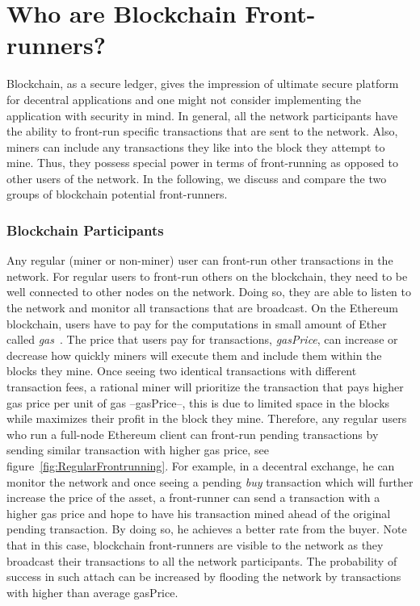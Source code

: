 
\section{Who are Blockchain Front-runners?} %
\label{sec:who can front-run?}

Blockchain, as a secure ledger, gives the impression of ultimate secure platform for decentral applications and one might not consider implementing the application with security in mind. In general, all the network participants have the ability to front-run specific transactions that are sent to the network. Also, miners can include any transactions they like into the block they attempt to mine. Thus, they possess special power in terms of front-running as opposed to other users of the network. In the following, we discuss and compare the two groups of blockchain potential front-runners.

\subsubsection{Blockchain Participants}
Any regular (miner or non-miner) user can front-run other transactions in the network. For regular users to front-run others on the blockchain, they need to be well connected to other nodes on the network. Doing so, they are able to listen to the network and monitor all transactions that are broadcast. On the Ethereum blockchain, users have to pay for the computations in small amount of Ether called \textit{gas}~\cite{AccountT67:online}. The price that users pay for transactions, \textit{gasPrice}, can increase or decrease how quickly miners will execute them and include them within the blocks they mine. Once seeing two identical transactions with different transaction fees, a rational miner will prioritize the transaction that pays higher gas price per unit of gas --gasPrice--, this is due to limited space in the blocks while maximizes their profit in the block they mine. Therefore, any regular users who run a full-node Ethereum client can front-run pending transactions by sending similar transaction with higher gas price, see figure~\ref{fig:RegularFrontrunning}. For example, in a decentral exchange, he can monitor the network and once seeing a pending \textit{buy} transaction which will further increase the price of the asset, a front-runner can send a transaction with a higher gas price and hope to have his transaction mined ahead of the original pending transaction. By doing so, he achieves a better rate from the buyer. Note that in this case, blockchain front-runners are visible to the network as they broadcast their transactions to all the network participants. The probability of success in such attach can be increased by flooding the network by transactions with higher than average gasPrice.

